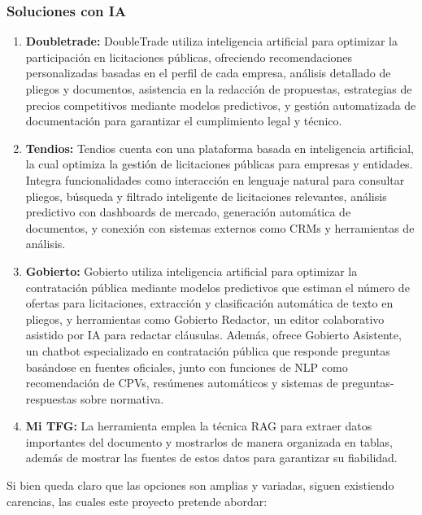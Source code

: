 \documentclass{article}
\begin{document}
\subsubsection{Soluciones con IA}
\begin{enumerate}
    \item \textbf{Doubletrade:} DoubleTrade utiliza inteligencia artificial para optimizar la participación en licitaciones públicas, ofreciendo recomendaciones personalizadas basadas en el perfil de cada empresa, análisis detallado de pliegos y documentos, asistencia en la redacción de propuestas, estrategias de precios competitivos mediante modelos predictivos, y gestión automatizada de documentación para garantizar el cumplimiento legal y técnico.
    \newline
    \item \textbf{Tendios:}
    Tendios cuenta con una plataforma basada en inteligencia artificial, la cual optimiza la gestión de licitaciones públicas para empresas y entidades. Integra funcionalidades como interacción en lenguaje natural para consultar pliegos, búsqueda y filtrado inteligente de licitaciones relevantes, análisis predictivo con dashboards de mercado, generación automática de documentos, y conexión con sistemas externos como CRMs y herramientas de análisis.
    \newline
    \item \textbf{Gobierto:} 
    Gobierto utiliza inteligencia artificial para optimizar la contratación pública mediante modelos predictivos que estiman el número de ofertas para licitaciones, extracción y clasificación automática de texto en pliegos, y herramientas como Gobierto Redactor, un editor colaborativo asistido por IA para redactar cláusulas. Además, ofrece Gobierto Asistente, un chatbot especializado en contratación pública que responde preguntas basándose en fuentes oficiales, junto con funciones de NLP como recomendación de CPVs, resúmenes automáticos y sistemas de preguntas-respuestas sobre normativa.
    \item \textbf{Mi TFG:} 
    La herramienta emplea la técnica RAG para extraer datos importantes del documento y mostrarlos de manera organizada en tablas, además de mostrar las fuentes de estos datos para garantizar su fiabilidad. 

\end{enumerate}


Si bien queda claro que las opciones son amplias y variadas, siguen existiendo carencias, las cuales este proyecto pretende abordar:
\end{document}
